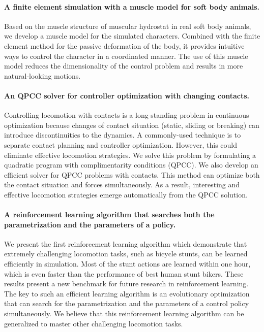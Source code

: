 \paragraph{A finite element simulation with a muscle model for soft body animals.} Based on the muscle structure of muscular hydrostat in real soft body animals, we develop a muscle model for the simulated characters. Combined with the finite element method for the passive deformation of the body, it provides intuitive ways to control the character in a coordinated manner. The use of this muscle model reduces the dimensionality of the control problem and results in more natural-looking motions.

\paragraph{An QPCC solver for controller optimization with changing contacts.} Controlling locomotion with contacts is a long-standing problem in continuous optimization because changes of contact situation (static, sliding or breaking) can introduce discontinuities to the dynamics. A commonly-used technique is to separate contact planning and controller optimization. However, this could eliminate effective locomotion strategies. We solve this problem by formulating a quadratic program with complimentarity conditions (QPCC). We also develop an efficient solver for QPCC problems with contacts. This method can optimize both the contact situation and forces simultaneously. As a result, interesting and effective locomotion strategies emerge automatically from the QPCC solution.

\paragraph{A reinforcement learning algorithm that searches both the parametrization and the parameters of a policy.} We present the first reinforcement learning algorithm which demonstrate that extremely challenging locomotion tasks, such as bicycle stunts, can be learned efficiently in simulation. Most of the stunt actions are learned within one hour, which is even faster than the performance of best human stunt bikers. These results present a new benchmark for future research in reinforcement learning. The key to such an efficient learning algorithm is an evolutionary optimization that can search for the parametrization and the parameters of a control policy simultaneously. We believe that this reinforcement learning algorithm can be generalized to master other challenging locomotion tasks.

